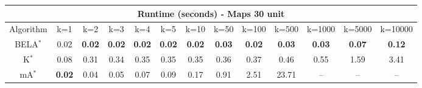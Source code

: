 \begin{tabular}{c|cccccccccccc}\toprule
\multicolumn{13}{c}{Runtime (seconds) - Maps 30 unit}\\ \midrule
Algorithm & k=1 & k=2 & k=3 & k=4 & k=5 & k=10 & k=50 & k=100 & k=500 & k=1000 & k=5000 & k=10000 \\ \midrule
BELA$^*$ & 0.02 & \textbf{0.02} & \textbf{0.02} & \textbf{0.02} & \textbf{0.02} & \textbf{0.02} & \textbf{0.03} & \textbf{0.02} & \textbf{0.03} & \textbf{0.03} & \textbf{0.07} & \textbf{0.12} \\
K$^*$ & 0.08 & 0.31 & 0.34 & 0.35 & 0.35 & 0.35 & 0.36 & 0.37 & 0.46 & 0.55 & 1.59 & 3.41 \\
mA$^*$ & \textbf{0.02} & 0.04 & 0.05 & 0.07 & 0.09 & 0.17 & 0.91 & 2.51 & 23.71 & -- & -- & -- \\ \bottomrule 
\end{tabular}
